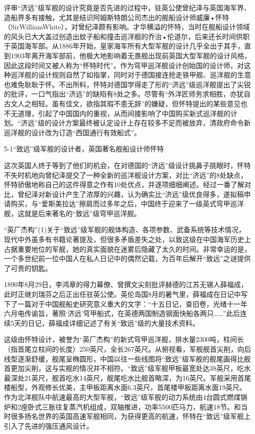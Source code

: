 \documentclass[12pt,UTF8]{ctexbook}
\begin{document}
评审“济远”级军舰的设计究竟是否先进的过程中，驻英公使曾纪泽与英国海军界、造船界多有接触，尤其是结识阿姆斯特朗公司杰出的舰船设计师威廉•怀特（SirWilliamWhite），对曾纪泽颇有影响。才华横溢的怀特，当时在舰船设计领域的风头已大大盖过创造出蚊子船和撞击巡洋舰的乔治•伦道尔，后来还长时间供职于英国海军部。从1886年开始，皇家海军所有大型军舰的设计几乎全出于其手，直到1903年离开海军部前，他极大地影响着无畏舰出现前英国大型军舰的设计风格，因此这段时间又被人称为“怀特时代”。作为穹甲巡洋舰设计创始国的设计师，对这种巡洋舰的设计规则自然了如指掌，同时对于德国接连抢走铁甲舰、巡洋舰的生意也难免耿耿于怀。不出所料，怀特对德国学得走了形的“济远”级巡洋舰提出了尖锐的批评，一口气指出“济远”的缺陷有8处之多。尽管有“外洋匠师务求相胜，亦犹自古文人之相轻。虽有佳文，欲指其瑕不患无辞”的嫌疑，但怀特提出的某些意见也不无道理，引起了中国国内的重视，从而间接影响了中国购买新式巡洋舰的计划。“济远”级的设计方案最终被认定设计上存在较多不足而被放弃，清政府命令新巡洋舰的设计改为订造“西国通行有效船式”。

5-1“致远”级军舰的设计者，英国著名舰船设计师怀特

这次英国人终于等到了他们的机会，在对德国的“济远”级设计挑鼻子挑眼时，怀特不失时机地向曾纪泽提交了一种全新的巡洋舰设计方案，对比“济远”的8处缺点，怀特骄傲地称自己的这件得意之作有10处优点，并逐项细细阐述。经过一番了解对比，曾纪泽对新设计产生了浓厚的兴趣，认为确实比“济远”级优良得多，遂拟稿申请购买，与“爱斯美拉达”擦肩而过多年之后，中国终于迎来了一级英式穹甲巡洋舰，这就是后来著名的“致远”级穹甲巡洋舰。

“英厂杰构”(1)关于“致远”级军舰的舰体构造、各项参数、武备系统等技术情况，现代中外虽多有书籍论著提及，但很多矛盾差失之处，以致这级在中国海军历史上占据重要地位的军舰，她的真实面貌在迷雾后隐藏了太久的时间。非常幸运的是，一个多世纪前一位中国人在私人日记中的偶然记载，为百年后解开“致远”之谜提供了可贵的钥匙。

1890年8月29日，李鸿章的得力幕僚、曾撰文尖刻批评赫德的江苏无锡人薛福成，此时正继刘瑞芬之后正出任驻英公使。英伦岛国8月的暑气里，薛福成在日记中写下了一篇对于中国舰船史研究意义重大的文字：“十五日记，查旧卷，光绪十一年六月电传谕旨，著照‘济远’穹甲船式，在英德两国制造钢面快船各两只……”此后连续5天的日记，薛福成详细记述了有关“致远”级的大量技术资料。

这级由怀特设计，被誉为“英厂杰构”的新式穹甲巡洋舰，排水量2300吨，柱间长（指首尾立柱间的长度）250英尺，全长267英尺。从俯视看，军舰舰首尖削，向后线型逐渐舒缓，舰尾呈椭圆形，中国以往一些线图将“致远”级军舰的舰尾画得比舰首更加尖削，这与实舰的情况并不相符。“致远”级军舰甲板最宽处达38英尺，吃水最深处21英尺，舰首吃水14英尺，舰尾吃水比舰首略深，为16英尺。军舰采用首尾楼船型，外观修长优美，主甲板距离水面6.3英尺，首尾楼甲板距离水面19英尺。作为北洋舰队中航速最高的大型军舰，“致远”级军舰的动力系统由4台圆式燃煤锅炉和2座卧式三胀往复蒸汽机组成，双轴推进，功率5500匹马力，航速18节。和当时很多扬名世界的英国高速军舰相同，为获得更高的航速，怀特在“致远”级军舰上引入了先进的强压通风设计。
\end{document}
